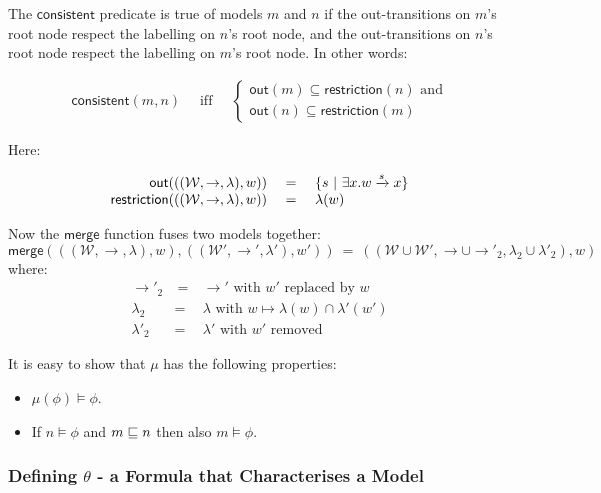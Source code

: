 \NI The $\mathsf{consistent}$ predicate is true of models $m$ and $n$ if
the out-transitions on $m$'s root node respect the labelling on $n$'s
root node, and the out-transitions on $n$'s root node respect the
labelling on $m$'s root node. In other words:

\begin{eqnarray*}
  \mathsf{consistent}(m, n) 
     &\ \mbox{ iff }\ & 
  \begin{cases}
    \mathsf{out}(m) \subseteq \mathsf{restriction}(n) \mbox{ and}  \\
    \mathsf{out}(n) \subseteq \mathsf{restriction}(m) 
  \end{cases}
\end{eqnarray*}

\NI Here:

\[
\begin{array}{rcl}
  \mathsf{out}(((\mathcal{W},\rightarrow,\lambda),w)) 
     &\ =\ & \{ s \ | \  \exists x . w \xrightarrow{s} x \}  \\
  \mathsf{restriction}(((\mathcal{W},\rightarrow,\lambda),w)) 
    & = & 
  \lambda(w) 
\end{array}
\]

\NI Now the $\mathsf{merge}$ function fuses two  models together:
\[
   \mathsf{merge}( ( (\mathcal{W}, \rightarrow, \lambda), w),  ( (\mathcal{W}', \rightarrow', \lambda'), w')) 
      \ =\ 
   ((\mathcal{W} \cup \mathcal{W}', \rightarrow \cup \rightarrow'_2, \lambda_2 \cup \lambda'_2), w)
\]
where:
\begin{eqnarray*}
  \rightarrow'_2 &\ =\ & \rightarrow' \mbox{ with } w' \mbox{ replaced by } w  \\
  \lambda_2 & = & \lambda \mbox{ with } w \mapsto \lambda(w) \cap \lambda'(w')  \\
  \lambda'_2 & = & \lambda' \mbox{ with } w' \mbox{ removed } 
\end{eqnarray*}

\NI It is easy to show that $\mu$ has the following properties:

\begin{itemize}

\item $\mu(\phi) \models \phi$.

\item If $n \models \phi$ and  $m \sqsubseteq n$ then also  $m \models \phi$.
 
\end{itemize}

\subsubsection{Defining $\theta$ - a Formula that Characterises a Model}


